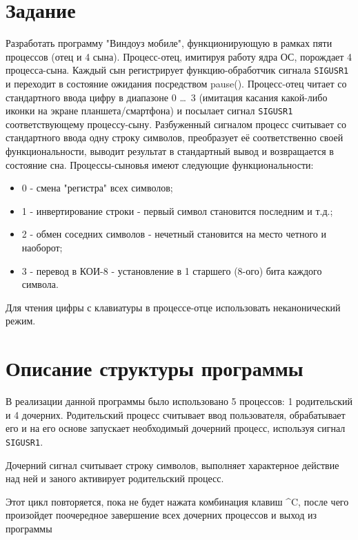 \section*{Задание}

Разработать программу "Виндоуз мобиле", функционирующую в рамках пяти процессов
(отец и 4 сына). Процесс-отец, имитируя работу ядра ОС, порождает 4
процесса-сына. Каждый сын регистрирует функцию-обработчик сигнала \texttt{SIGUSR1} и
переходит в состояние ожидания посредством pause(). Процесс-отец читает со
стандартного ввода цифру в диапазоне 0 \ldots ~3 (имитация касания какой-либо иконки
на экране планшета/смартфона) и посылает сигнал \texttt{SIGUSR1} соответствующему
процессу-сыну. Разбуженный сигналом процесс считывает со стандартного ввода одну
строку символов, преобразует её соответственно своей функциональности, выводит
результат в стандартный вывод и возвращается в состояние сна. Процессы-сыновья
имеют следующие функциональности:
\begin{itemize}
    \item 0 - смена "регистра" всех символов;
    \item 1 - инвертирование строки - первый символ становится последним и т.д.;
    \item 2 - обмен соседних символов - нечетный становится на место четного и наоборот;
    \item 3 - перевод в КОИ-8 - установление в 1 старшего (8-ого) бита каждого символа.
\end{itemize}
Для чтения цифры с клавиатуры в процессе-отце использовать неканонический режим.

\newpage

\section*{Описание структуры программы}

В реализации данной программы было использовано 5 процессов: 1 родительский и 4 дочерних.
Родительский процесс считывает ввод пользователя, обрабатывает его и на его
основе запускает необходимый дочерний процесс, используя сигнал \texttt{SIGUSR1}.

Дочерний сигнал считывает строку символов, выполняет характерное действие над
ней и заного активирует родительский процесс.

Этот цикл повторяется, пока не будет нажата комбинация клавиш \^{}C, после чего
произойдет поочередное завершение всех дочерних процессов и выход из программы

